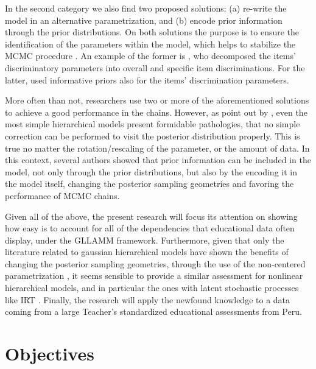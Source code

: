 In the second category we also find two proposed solutions: (a) re-write the model in an alternative parametrization, and (b) encode prior information through the prior distributions. On both solutions the purpose is to ensure the identification of the parameters within the model, which helps to stabilize the MCMC procedure \cite{Gelman_et_al_2014}. An example of the former is \citet{Fujimoto_2018a}, who decomposed the items' discriminatory parameters into overall and specific item discriminations. For the latter, \citet{Fujimoto_2020} used informative priors also for the items' discrimination parameters.

More often than not, researchers use two or more of the aforementioned solutions to achieve a good performance in the chains. However, as point out by \citet{Betancourt_et_al_2013}, even the most simple hierarchical models present formidable pathologies, that no simple correction can be performed to visit the posterior distribution properly. This is true no matter the rotation/rescaling of the parameter, or the amount of data. In this context, several authors \cite{Gelfand_et_al_1995, Gelfand_et_al_1996, Papaspiliopoulos_et_al_2003, Papaspiliopoulos_et_al_2007, Betancourt_et_al_2013} showed that prior information can be included in the model, not only through the prior distributions, but also by the encoding it in the model itself, changing the posterior sampling geometries and favoring the performance of MCMC chains.

Given all of the above, the present research will focus its attention on showing how easy is to account for all of the dependencies that educational data often display, under the GLLAMM framework. Furthermore,  given that only the literature related to gaussian hierarchical models have shown the benefits of changing the posterior sampling geometries, through the use of the non-centered parametrization \cite{Gelfand_et_al_1995, Gelfand_et_al_1996, Papaspiliopoulos_et_al_2003, Papaspiliopoulos_et_al_2007, Betancourt_et_al_2013}, it seems sensible to provide a similar assessment for nonlinear hierarchical models, and in particular the ones with latent stochastic processes like IRT \cite{Papaspiliopoulos_et_al_2007}. Finally, the research will apply the newfound knowledge to a data coming from a large Teacher's standardized educational assessments from Peru.




\section{Objectives}

